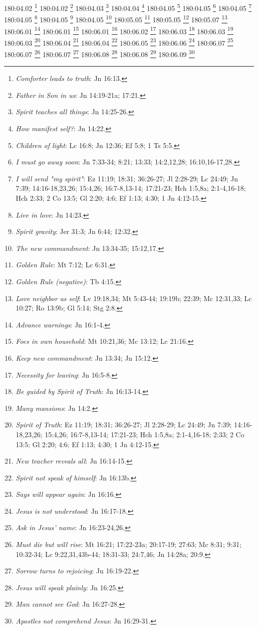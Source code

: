 180:04.02 \footnote{\textit{Comforter leads to truth}: Jn 16:13.}
180:04.02 \footnote{\textit{Father in Son in us}: Jn 14:19-21a; 17:21.}
180:04.03 \footnote{\textit{Spirit teaches all things}: Jn 14:25-26.}
180:04.04 \footnote{\textit{How manifest self?}: Jn 14:22.}
180:04.05 \footnote{\textit{Children of light}: Lc 16:8; Jn 12:36; Ef 5:8; 1 Ts 5:5.}
180:04.05 \footnote{\textit{I must go away soon}: Jn 7:33-34; 8:21; 13:33; 14:2,12,28; 16:10,16-17,28.}
180:04.05 \footnote{\textit{I will send "my spirit"}: Ez 11:19; 18:31; 36:26-27; Jl 2:28-29; Lc 24:49; Jn 7:39; 14:16-18,23,26; 15:4,26; 16:7-8,13-14; 17:21-23; Hch 1:5,8a; 2:1-4,16-18; Hch 2:33; 2 Co 13:5; Gl 2:20; 4:6; Ef 1:13; 4:30; 1 Jn 4:12-15.}
180:04.05 \footnote{\textit{Live in love}: Jn 14:23.}
180:04.05 \footnote{\textit{Spirit gravity}: Jer 31:3; Jn 6:44; 12:32.}
180:04.05 \footnote{\textit{The new commandment}: Jn 13:34-35; 15:12,17.}
180:05.05 \footnote{\textit{Golden Rule}: Mt 7:12; Lc 6:31.}
180:05.05 \footnote{\textit{Golden Rule (negative)}: Tb 4:15.}
180:05.07 \footnote{\textit{Love neighbor as self}: Lv 19:18,34; Mt 5:43-44; 19:19b; 22:39; Mc 12:31,33; Lc 10:27; Ro 13:9b; Gl 5:14; Stg 2:8.}
180:06.01 \footnote{\textit{Advance warnings}: Jn 16:1-4.}
180:06.01 \footnote{\textit{Foes in own household}: Mt 10:21,36; Mc 13:12; Lc 21:16.}
180:06.01 \footnote{\textit{Keep new commandment}: Jn 13:34; Jn 15:12.}
180:06.02 \footnote{\textit{Necessity for leaving}: Jn 16:5-8.}
180:06.03 \footnote{\textit{Be guided by Spirit of Truth}: Jn 16:13-14.}
180:06.03 \footnote{\textit{Many mansions}: Jn 14:2.}
180:06.03 \footnote{\textit{Spirit of Truth}: Ez 11:19; 18:31; 36:26-27; Jl 2:28-29; Lc 24:49; Jn 7:39; 14:16-18,23,26; 15:4,26; 16:7-8,13-14; 17:21-23; Hch 1:5,8a; 2:1-4,16-18; 2:33; 2 Co 13:5; Gl 2:20; 4:6; Ef 1:13; 4:30; 1 Jn 4:12-15.}
180:06.04 \footnote{\textit{New teacher reveals all}: Jn 16:14-15.}
180:06.04 \footnote{\textit{Spirit not speak of himself}: Jn 16:13b.}
180:06.05 \footnote{\textit{Says will appear again}: Jn 16:16.}
180:06.06 \footnote{\textit{Jesus is not understood}: Jn 16:17-18.}
180:06.07 \footnote{\textit{Ask in Jesus' name}: Jn 16:23-24,26.}
180:06.07 \footnote{\textit{Must die but will rise}: Mt 16:21; 17:22-23a; 20:17-19; 27:63; Mc 8:31; 9:31; 10:32-34; Lc 9:22,31,43b-44; 18:31-33; 24:7,46; Jn 14:28a; 20:9.}
180:06.07 \footnote{\textit{Sorrow turns to rejoicing}: Jn 16:19-22.}
180:06.08 \footnote{\textit{Jesus will speak plainly}: Jn 16:25.}
180:06.08 \footnote{\textit{Man cannot see God}: Jn 16:27-28.}
180:06.09 \footnote{\textit{Apostles not comprehend Jesus}: Jn 16:29-31.}
